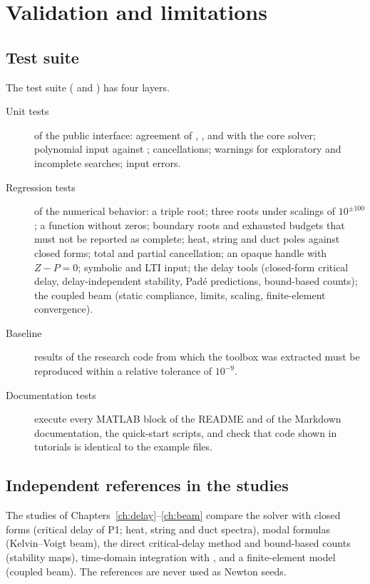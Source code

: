 \chapter{Validation and limitations}\label{ch:validation}

\section{Test suite}

The test suite ( and ) has four
layers.
\begin{description}
  \item[Unit tests] of the public interface: agreement of ,
    ,  and  with the core solver;
    polynomial input against ; cancellations; warnings for
    exploratory and incomplete searches; input errors.
  \item[Regression tests] of the numerical behavior: a triple root; three
    roots under scalings of $10^{\pm100}$; a function without zeros;
    boundary roots and exhausted budgets that must not be reported as
    complete; heat, string and duct poles against closed forms; total and
    partial cancellation; an opaque handle with $Z-P=0$; symbolic and LTI
    input; the delay tools (closed-form critical delay, delay-independent
    stability, Padé predictions, bound-based counts); the coupled beam
    (static compliance, limits, scaling, finite-element convergence).
  \item[Baseline] results of the research code from which the toolbox was
    extracted must be reproduced within a relative tolerance of $10^{-9}$.
  \item[Documentation tests] execute every MATLAB block of the README and
    of the Markdown documentation, the quick-start scripts, and check that
    code shown in tutorials is identical to the example files.
\end{description}

\section{Independent references in the studies}

The studies of Chapters~\ref{ch:delay}--\ref{ch:beam} compare the solver
with closed forms (critical delay of P1; heat, string and duct spectra),
modal formulas (Kelvin--Voigt beam), the direct critical-delay method and
bound-based counts (stability maps), time-domain integration with
, and a finite-element model (coupled beam). The references are
never used as Newton seeds.


